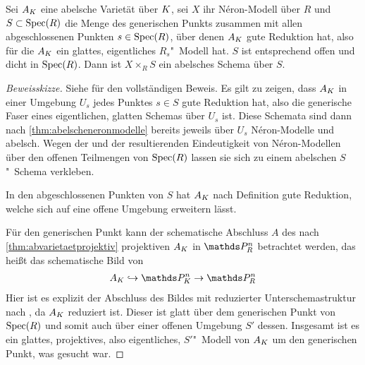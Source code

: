 \begin{Satz}\label{thm:teilwabelscheneronmodelle}
  Sei $A_{K}$ eine abelsche Varietät über $K$,
  sei $X$ ihr Néron-Modell über $R$ und
  $S\subset\operatorname{Spec}(R)$ die Menge des generischen Punkts zusammen mit
  allen abgeschlossenen Punkten $s\in\operatorname{Spec}(R)$, über denen $A_{K}$ gute
  Reduktion hat, also für die $A_{K}$ ein glattes, eigentliches
  $R_s$"~Modell hat.
  $S$ ist entsprechend offen und dicht in $\operatorname{Spec}(R)$.
  Dann ist $X\times_R S$ ein abelsches Schema über $S$.
  \begin{proof}[Beweisskizze] Siehe \cite[Theorem~1.4/3]{neron} für
    den vollständigen Beweis.
    Es gilt zu zeigen, dass $A_{K}$ in einer Umgebung $U_s$ jedes
    Punktes $s\in S$ gute Reduktion hat, also die generische Faser eines
    eigentlichen, glatten Schemas über $U_s$ ist.
    Diese Schemata sind dann nach \ref{thm:abelscheneronmodelle}
    bereits jeweils über $U_s$ Néron-Modelle und abelsch.
    Wegen der \NAbbEig und der resultierenden Eindeutigkeit von
    Néron-Modellen über den offenen Teilmengen von $\operatorname{Spec}(R)$
    lassen sie sich zu einem abelschen $S$"~Schema verkleben.

    In den abgeschlossenen Punkten von $S$ hat $A_{K}$ nach Definition
    gute Reduktion, welche sich auf eine offene Umgebung erweitern
    lässt.
    
    Für den generischen Punkt kann der schematische
    Abschluss $A$ des nach \ref{thm:abvarietaetprojektiv} projektiven
    $A_{K}$ in $\P_R^n$ betrachtet werden, das heißt das schematische
    Bild von
    \begin{gather*}
      A_\K\hookrightarrow\P_\K^n\to\P_R^n
    \end{gather*}
    Hier ist es explizit der Abschluss des Bildes mit reduzierter
    Unterschemastruktur nach \cite[Remark~10.32]{wedhorn}, da $A_{K}$
    reduziert ist.
    Dieser ist glatt über dem generischen Punkt von $\operatorname{Spec}(R)$
    und somit auch über einer offenen Umgebung $S'$ dessen.
    Insgesamt ist es ein glattes, projektives, also eigentliches,
    $S'$"~Modell von $A_{K}$ um den generischen Punkt, was gesucht war.
  \end{proof}
\end{Satz}


